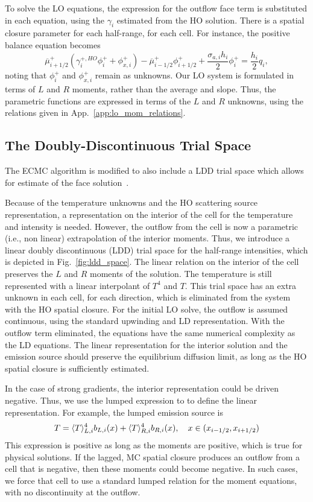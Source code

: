 To solve the LO equations, the expression for the outflow face term is substituted in each equation, using the
$\gamma_i$ estimated from the HO solution. There is a spatial closure parameter for each
half-range, for each cell.
For instance, the positive balance equation becomes
\begin{equation}
    \overline\mu^+_{i+1/2}\left( \gamma_i^{+,HO} \phi_i^+ + \phi_{x,i}^+ \right) - \overline\mu^+_{i-1/2}\phi_{i+1/2}^+ +
    \frac{\sigma_{a,i}h_i}{2} \phi_i^+ = \frac{h_i}{2} q_i,
    \label{eqn:clsd_posbal}
\end{equation}
noting that $\phi_i^+$ and $\phi_{x,i}^+$ remain as unknowns.  Our LO system is formulated in terms of $L$ and $R$ moments, rather than the average and
slope.  Thus, the parametric functions are expressed in terms of the $L$ and $R$
unknowns, using the relations given in App.~\ref{app:lo_mom_relations}.  


\subsection{The Doubly-Discontinuous Trial Space}

The ECMC algorithm is modified to also include a LDD trial space which allows for estimate
of the face solution~\cite{sec:ldd_mc}.

Because of the temperature unknowns and the HO scattering source representation, a
representation on the interior of the cell for the temperature and intensity is needed.
However, the outflow from the cell is now a parametric (i.e., non linear)
extrapolation of the interior moments. Thus, we introduce a linear doubly
discontinuous (LDD) trial space for the half-range intensities, which is depicted in Fig.~\ref{fig:ldd_space}.
The linear relation on the interior of the cell preserves the $L$ and $R$ moments of the
solution.  The temperature is still represented with a linear interpolant of $T^4$ and
$T$.  This trial space has an extra unknown in each cell, for each direction, which is eliminated from the system
with the HO spatial closure.  For the initial LO solve, the outflow is assumed continuous, using the standard
upwinding and LD representation.  With the outflow term eliminated, the equations
have the same numerical complexity as the LD equations.  The linear representation for the
interior solution and the emission source should preserve the equilibrium diffusion limit,
as long as the HO spatial closure is sufficiently estimated.

In the case of strong gradients, the interior representation could be driven
negative.  Thus, we use the lumped expression to to define the linear representation.  For
example, the lumped emission source is
\begin{equation}
    T = \langle T \rangle_{L,i}^4 b_{L,i}(x) + \langle T \rangle_{R,i}^4 b_{R,i}(x) , \quad x\in({x_{i-1/2}},{x_{i+1/2}})
\end{equation}
This expression is positive as long as the moments are positive, which is true for
physical solutions.  If the lagged, MC spatial closure produces an outflow from a cell that is
negative, then these moments could become negative.  In such cases, we force that cell to
use a standard lumped relation for the moment equations, with no discontinuity at the
outflow.  

